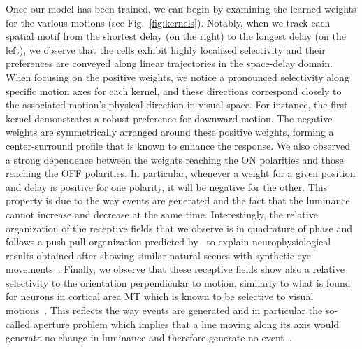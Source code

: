 \documentclass[default]{sn-jnl}%
\theoremstyle{thmstyleone}%
\theoremstyle{thmstyletwo}%
\theoremstyle{thmstylethree}%
\newcommand{\seeFig}[1]{see Fig.~\ref{fig:#1}}%
\begin{document}
%
%
Once our model has been trained, we can begin by examining the learned weights for the various motions (\seeFig{kernels}). Notably, when we track each spatial motif from the shortest delay (on the right) to the longest delay (on the left), we observe that the cells exhibit highly localized selectivity and their preferences are conveyed along linear trajectories in the space-delay domain. When focusing on the positive weights, we notice a pronounced selectivity along specific motion axes for each kernel, and these directions correspond closely to the associated motion's physical direction in visual space. For instance, the first kernel demonstrates a robust preference for downward motion. The negative weights are symmetrically arranged around these positive weights, forming a center-surround profile that is known to enhance the response. We also observed a strong dependence between the weights reaching the ON polarities and those reaching the OFF polarities. In particular, whenever a weight for a given position and delay is positive for one polarity, it will be negative for the other. This property is due to the way events are generated and the fact that the luminance cannot increase and decrease at the same time.  Interestingly, the relative organization of the receptive fields that we observe is in quadrature of phase and follows a push-pull organization predicted by~\citet{kremkow_push-pull_2016} to explain neurophysiological results obtained after showing similar natural scenes with synthetic eye movements~\citep{baudot_animation_2013}. Finally, we observe that these receptive fields show also a relative selectivity to the orientation perpendicular to motion, similarly to what is found for neurons in cortical area MT which is known to be selective to visual motions~\citep{deangelis_functional_1999}. This reflects the way events are generated and in particular the so-called aperture problem which implies that a line moving along its axis would generate no change in luminance and therefore generate no event~\citep{perrinet_motion-based_2012}.
\end{document}
